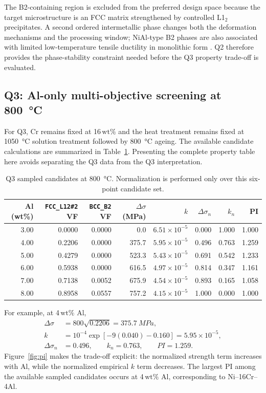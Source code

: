 \documentclass[11pt]{article}
\newcommand{\wtpct}{\ensuremath{\,\mathrm{wt}\%}}
\newcommand{\phase}[1]{\texttt{#1}}
\begin{document}
The B2-containing region is excluded from the preferred design space because the target microstructure is an FCC matrix strengthened by controlled L1$_2$ precipitates. A second ordered intermetallic phase changes both the deformation mechanisms and the processing window; NiAl-type B2 phases are also associated with limited low-temperature tensile ductility in monolithic form \cite{noebe}. Q2 therefore provides the phase-stability constraint needed before the Q3 property trade-off is evaluated.

\subsection{Q3: Al-only multi-objective screening at \SI{800}{\degreeCelsius}}
For Q3, Cr remains fixed at 16\wtpct{} and the heat treatment remains fixed at \SI{1050}{\degreeCelsius} solution treatment followed by \SI{800}{\degreeCelsius} ageing. The available candidate calculations are summarized in Table~\ref{tab:q3}. Presenting the complete property table here avoids separating the Q3 data from the Q3 interpretation.

\begin{table}[H]
\centering
\caption{Q3 sampled candidates at \SI{800}{\degreeCelsius}. Normalization is performed only over this six-point candidate set.}
\label{tab:q3}
\small
\begin{tabular}{@{}rrrrrrrr@{}}
\toprule
Al (wt\%) & \phase{FCC\_L12\#2} VF & \phase{BCC\_B2} VF & $\Delta\sigma$ (MPa) & $k$ & $\Delta\sigma_n$ & $k_n$ & PI \\
\midrule
3.00 & 0.0000 & 0.0000 & 0.0   & $6.51\times10^{-5}$ & 0.000 & 1.000 & 1.000 \\
4.00 & 0.2206 & 0.0000 & 375.7 & $5.95\times10^{-5}$ & 0.496 & 0.763 & 1.259 \\
5.00 & 0.4279 & 0.0000 & 523.3 & $5.43\times10^{-5}$ & 0.691 & 0.542 & 1.233 \\
6.00 & 0.5938 & 0.0000 & 616.5 & $4.97\times10^{-5}$ & 0.814 & 0.347 & 1.161 \\
7.00 & 0.7138 & 0.0052 & 675.9 & $4.54\times10^{-5}$ & 0.893 & 0.165 & 1.058 \\
8.00 & 0.8958 & 0.0557 & 757.2 & $4.15\times10^{-5}$ & 1.000 & 0.000 & 1.000 \\
\bottomrule
\end{tabular}
\end{table}

For example, at 4\wtpct{} Al,
\begin{align}
\Delta\sigma &= 800\sqrt{0.2206}=\SI{375.7}{MPa},\\
k &= 10^{-4}\exp[-9(0.040)-0.160]=5.95\times10^{-5},\\
\Delta\sigma_n &= 0.496,\qquad k_n=0.763,\qquad PI=1.259.
\end{align}
Figure~\ref{fig:pi} makes the trade-off explicit: the normalized strength term increases with Al, while the normalized empirical $k$ term decreases. The largest PI among the available sampled candidates occurs at 4\wtpct{} Al, corresponding to Ni--16Cr--4Al.
\end{document}
